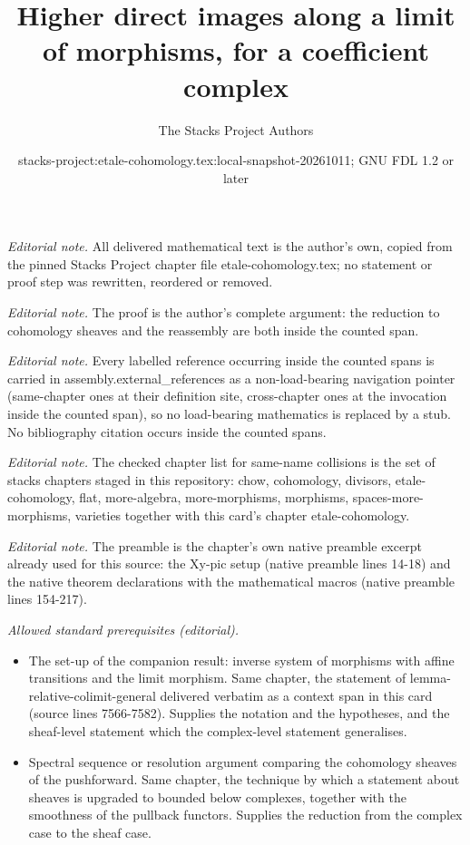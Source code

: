 \documentclass[10pt,a4paper]{amsart}
\title{Higher direct images along a limit of morphisms, for a coefficient complex}
\author{The Stacks Project Authors}
\date{stacks-project:etale-cohomology.tex:local-snapshot-20261011; GNU FDL 1.2 or later}
\theoremstyle{plain}
\theoremstyle{definition}
\theoremstyle{remark}
\numberwithin{equation}{subsection}
\begin{document}
\maketitle
\noindent\textit{Editorial note.} All delivered mathematical text is the author's own, copied from the pinned Stacks Project chapter file etale-cohomology.tex; no statement or proof step was rewritten, reordered or removed.\par\medskip
\noindent\textit{Editorial note.} The proof is the author's complete argument: the reduction to cohomology sheaves and the reassembly are both inside the counted span.\par\medskip
\noindent\textit{Editorial note.} Every labelled reference occurring inside the counted spans is carried in assembly.external\_references as a non-load-bearing navigation pointer (same-chapter ones at their definition site, cross-chapter ones at the invocation inside the counted span), so no load-bearing mathematics is replaced by a stub. No bibliography citation occurs inside the counted spans.\par\medskip
\noindent\textit{Editorial note.} The checked chapter list for same-name collisions is the set of stacks chapters staged in this repository: chow, cohomology, divisors, etale-cohomology, flat, more-algebra, more-morphisms, morphisms, spaces-more-morphisms, varieties together with this card's chapter etale-cohomology.\par\medskip
\noindent\textit{Editorial note.} The preamble is the chapter's own native preamble excerpt already used for this source: the Xy-pic setup (native preamble lines 14-18) and the native theorem declarations with the mathematical macros (native preamble lines 154-217).\par\medskip
\noindent\textit{Allowed standard prerequisites (editorial).}\begin{itemize}
\item The set-up of the companion result: inverse system of morphisms with affine transitions and the limit morphism. Same chapter, the statement of lemma-relative-colimit-general delivered verbatim as a context span in this card (source lines 7566-7582). Supplies the notation and the hypotheses, and the sheaf-level statement which the complex-level statement generalises.
\item Spectral sequence or resolution argument comparing the cohomology sheaves of the pushforward. Same chapter, the technique by which a statement about sheaves is upgraded to bounded below complexes, together with the smoothness of the pullback functors. Supplies the reduction from the complex case to the sheaf case.
\end{itemize}\medskip
\end{document}
